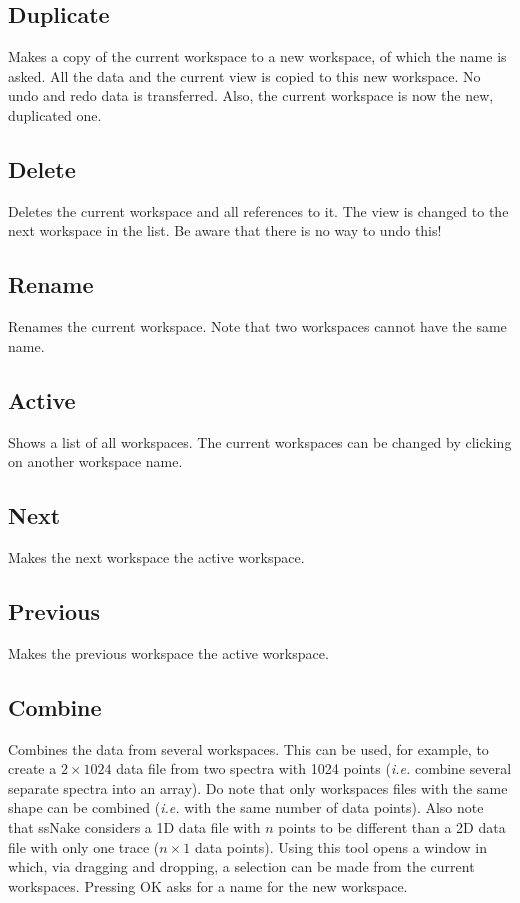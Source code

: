 \documentclass[11pt,a4paper]{article}
\begin{document}
\subsection{Duplicate}
Makes a copy of the current workspace to a new workspace, of which the name is asked. All the data and the current view is copied to this new workspace. No undo and redo data is transferred. Also, the current workspace is now the new, duplicated one.

\subsection{Delete}
Deletes the current workspace and all references to it. The view is changed to the next workspace in the list. Be aware that there is no way to undo this!

\subsection{Rename}
Renames the current workspace. Note that two workspaces cannot have the same name.

\subsection{Active}
Shows a list of all workspaces. The current workspaces can be changed by clicking on another workspace name.

\subsection{Next}
Makes the next workspace the active workspace.

\subsection{Previous}
Makes the previous workspace the active workspace.


\subsection{Combine}
Combines the data from several workspaces. This can be used, for example, to create a $2\times1024$ data file from two spectra with 1024 points (\textit{i.e.} combine several separate spectra into an array). Do note that only workspaces files with the same shape can be combined (\textit{i.e.} with the same number of data points). Also note that ssNake considers a 1D data file with $n$ points to be different than a 2D data file with only one trace ($n\times1$ data points). Using this tool opens a window in which, via dragging and dropping, a selection can be made from the current workspaces. Pressing OK asks for a name for the new workspace.
\end{document}
